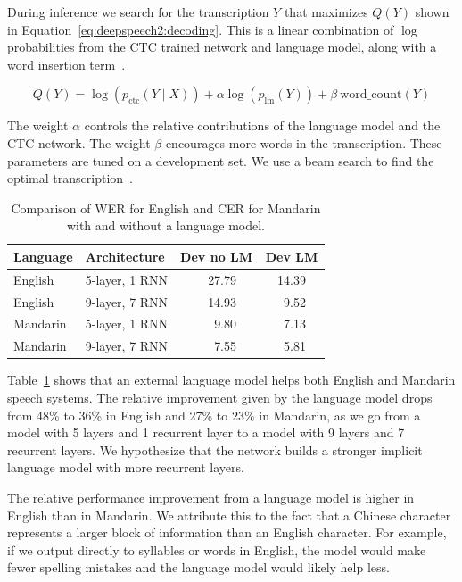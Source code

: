 During inference we search for the transcription $Y$ that maximizes $Q(Y)$
shown in Equation~\ref{eq:deepspeech2:decoding}. This is a linear combination
of $\log$ probabilities from the CTC trained network and language model, along
with a word insertion term~\cite{hannun2014deepspeech}. 

\begin{equation}
\label{eq:deepspeech2:decoding}
Q(Y) = \log (p_{\textrm{ctc}}(Y \mid X)) + \alpha \log(p_{\textrm{lm}}(Y))  + \beta \: \textrm{word\_count}(Y)
\end{equation}

The weight $\alpha$ controls the relative contributions of the language model
and the CTC network. The weight $\beta$ encourages more words in the
transcription. These parameters are tuned on a development set. We use a beam
search to find the optimal transcription~\cite{hannun2014firstpass}.

\begin{table}
\centering
\begin{tabular}{l  l  r r r r r r}
\toprule
Language & Architecture & \multicolumn{3}{c}{Dev no LM} & \multicolumn{3}{c}{Dev LM} \\
\midrule
English  & 5-layer, 1 RNN & & 27.79 & & & 14.39 & \\
English  & 9-layer, 7 RNN & & 14.93 & & & 9.52 & \\
Mandarin & 5-layer, 1 RNN & & 9.80  & & & 7.13 & \\
Mandarin & 9-layer, 7 RNN & & 7.55  & & & 5.81 & \\
\bottomrule
\end{tabular}
\caption{Comparison of WER for English and CER for Mandarin with and without a
         language model.}
\label{table:deepspeech2:languagemodels}
\end{table}

Table~\ref{table:deepspeech2:languagemodels} shows that an external language
model helps both English and Mandarin speech systems. The relative improvement
given by the language model drops from 48\% to 36\% in English and 27\% to 23\%
in Mandarin, as we go from a model with 5 layers and 1 recurrent layer to a
model with 9 layers and 7 recurrent layers. We hypothesize that the network
builds a stronger implicit language model with more recurrent layers. 

The relative performance improvement from a language model is higher in English
than in Mandarin. We attribute this to the fact that a Chinese character
represents a larger block of information than an English character. For
example, if we output directly to syllables or words in English, the model
would make fewer spelling mistakes and the language model would likely help
less.

